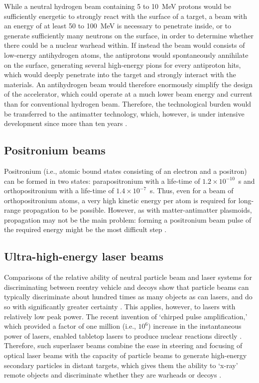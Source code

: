 \documentclass [12pt,a4paper,     ]{report} %
\begin{document}
  While a neutral hydrogen beam containing 5 to 10~MeV protons would be sufficiently energetic to strongly react with the surface of a target, a beam with an energy of at least 50 to 100~MeV is necessary to penetrate inside, or to generate sufficiently many neutrons on the surface, in order to determine whether there could be a nuclear warhead within.  If instead the beam would consists of low-energy antihydrogen atoms, the antiprotons would spontaneously annihilate on the surface, generating several high-energy pions for every antiproton hits, which would deeply penetrate into the target and strongly interact with the materials.  An antihydrogen beam would therefore enormously simplify the design of the accelerator, which could operate at a much lower beam energy and current than for conventional hydrogen beam.  Therefore, the technological burden would be transferred to the antimatter technology, which, however, is under intensive development since more than ten years \cite{GSPON1987B}.


\subsection{Positronium beams}

Positronium (i.e., atomic bound states consisting of an electron and a positron) can be formed in two states: parapositronium with a life-time of $1.2 \times 10^{-10}$~s and orthopositronium with a life-time of $1.4 \times 10^{-7}$~s. Thus, even for a beam of orthopositronium atoms, a very high kinetic energy per atom is required for long-range propagation to be possible.  However, as with matter-antimatter plasmoids, propagation may not be the main problem:  forming a positronium beam pulse of the required energy might be the most difficult step \cite{OTTWI1988-,WEBER1988-,SURKO1986-}.   



\subsection{Ultra-high-energy laser beams}

Comparisons of the relative ability of neutral particle beam and laser systems for discriminating between reentry vehicle and decoys show that particle beams can typically discriminate about hundred times as many objects as can lasers, and do so with significantly greater certainty \cite{CANAV1989-}. This applies, however, to lasers with relatively low peak power.  The recent invention of `chirped pulse amplification,' which provided a factor of one million (i.e., $10^6$) increase in the instantaneous power of lasers, enabled tabletop lasers to produce nuclear reactions directly \cite{MOURO1999-}. Therefore, such superlaser beams combine the ease in steering and focusing of optical laser beams with the capacity of particle beams to generate high-energy secondary particles in distant targets, which gives them the ability to `x-ray' remote objects and discriminate whether they are warheads or decoys \cite{GSPON2000-}.
\end{document}
